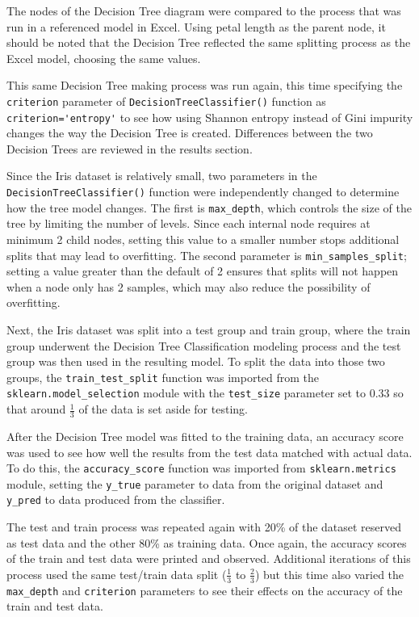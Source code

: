 \documentclass[journal]{IEEEtran}
\begin{document}
The nodes of the Decision Tree diagram were compared to the process that was run in a referenced model in Excel. Using petal length as the parent node, it should be noted that the Decision Tree reflected the same splitting process as the Excel model, choosing the same values.

This same Decision Tree making process was run again, this time specifying the \lstinline{criterion} parameter of \lstinline{DecisionTreeClassifier()} function as \lstinline{criterion='entropy'} to see how using Shannon entropy instead of Gini impurity changes the way the Decision Tree is created. Differences between the two Decision Trees are reviewed in the results section.

Since the Iris dataset is relatively small, two parameters in the \lstinline{DecisionTreeClassifier()} function were independently changed to determine how the tree model changes. The first is \lstinline{max_depth}, which controls the size of the tree by limiting the number of levels. Since each internal node requires at minimum 2 child nodes, setting this value to a smaller number stops additional splits that may lead to overfitting. The second parameter is \lstinline{min_samples_split}; setting a value greater than the default of 2 ensures that splits will not happen when a node only has 2 samples, which may also reduce the possibility of overfitting. 

Next, the Iris dataset was split into a test group and train group, where the train group underwent the Decision Tree Classification modeling process and the test group was then used in the resulting model. To split the data into those two groups, the \lstinline{train_test_split} function was imported from the \lstinline{sklearn.model_selection} module with the \lstinline{test_size} parameter set to 0.33 so that around \(\frac{1}{3}\) of the data is set aside for testing. 

After the Decision Tree model was fitted to the training data, an accuracy score was used to see how well the results from the test data matched with actual data. To do this, the \lstinline{accuracy_score} function was imported from \lstinline{sklearn.metrics} module, setting the \lstinline{y_true} parameter to data from the original dataset and \lstinline{y_pred} to data produced from the classifier. 

The test and train process was repeated again with 20\% of the dataset reserved as test data and the other 80\% as training data. Once again, the accuracy scores of the train and test data were printed and observed. Additional iterations of this process used the same test/train data split (\(\frac{1}{3}\) to \(\frac{2}{3}\)) but this time also varied the \lstinline{max_depth} and \lstinline{criterion} parameters to see their effects on the accuracy of the train and test data.
\end{document}
